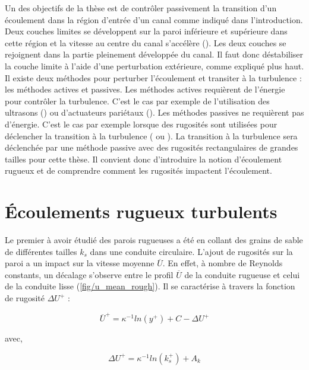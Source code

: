 Un des objectifs de la thèse est de contrôler passivement la transition d'un écoulement dans la région d'entrée d'un canal comme indiqué dans l'introduction. Deux couches limites se développent sur la paroi inférieure et supérieure dans cette région et la vitesse au centre du canal s'accélère (\cite{Durst2005}). Les deux couches se rejoignent dans la partie pleinement développée du canal. Il faut donc déstabiliser la couche limite à l'aide d'une perturbation extérieure, comme expliqué plus haut. Il existe deux méthodes pour perturber l'écoulement et transiter à la turbulence : les méthodes actives et passives. Les méthodes actives requièrent de l'énergie pour contrôler la turbulence. C'est le cas par exemple de l'utilisation des ultrasons (\cite{Poncet2021}) ou d'actuateurs pariétaux (\cite{Carlson1982}). Les méthodes passives ne requièrent pas d'énergie. C'est le cas par exemple lorsque des rugosités sont utilisées pour déclencher la transition à la turbulence (\cite{Anika2020} ou \cite{Vadlamani2018}). La transition à la turbulence sera déclenchée par une méthode passive avec des rugosités rectangulaires de grandes tailles pour cette thèse. Il convient donc d'introduire la notion d'écoulement rugueux et de comprendre comment les rugosités impactent l'écoulement.

\clearpage
\section{Écoulements rugueux turbulents}

Le premier à avoir étudié des parois rugueuses a été \cite{Nikuradse1933} en collant des grains de sable de différentes tailles $k_{s}$ dans une conduite circulaire. L'ajout de rugosités sur la paroi a un impact sur la vitesse moyenne $\overline{U}$. En effet, à nombre de Reynolds constants, un décalage s'observe entre le profil $\overline{U}$ de la conduite rugueuse et celui de la conduite lisse (\cref{fig/u_mean_rough}). Il se caractérise à travers la fonction de rugosité $\Delta U^{+}$ :

\begin{equation}
	\overline{U}^{+} = \kappa^{-1} ln(y^{+}) + C - \Delta U^{+}
\end{equation}

avec,

\begin{equation}
	\Delta U^{+} = \kappa^{-1} ln(k_{s}^{+}) + A_{k}
	\label{eq/roughness_function_k}
\end{equation}

